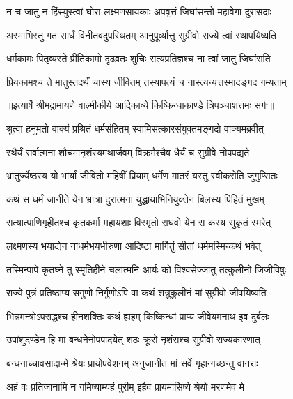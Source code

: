 \twolineshloka
{न च जातु न हिंस्युस्त्वां घोरा लक्ष्मणसायकाः}
{अपवृत्तं जिघांसन्तो महावेगा दुरासदाः} %

\twolineshloka
{अस्माभिस्तु गतं सार्धं विनीतवदुपस्थितम्}
{आनुपूर्व्यात्तु सुग्रीवो राज्ये त्वां स्थापयिष्यति} %

\twolineshloka
{धर्मकामः पितृव्यस्ते प्रीतिकामो दृढव्रतः}
{शुचिः सत्यप्रतिज्ञश्च ना त्वां जातु जिघांसति} %

\twolineshloka
{प्रियकामश्च ते मातुस्तदर्थं चास्य जीवितम्}
{तस्यापत्यं च नास्त्यन्यत्तस्मादङ्गद गम्यताम्} %


{॥इत्यार्षे श्रीमद्रामायणे वाल्मीकीये आदिकाव्ये किष्किन्धाकाण्डे त्रिपञ्चाशत्तमः सर्गः॥}


\twolineshloka
{श्रुत्वा हनुमतो वाक्यं प्रश्रितं धर्मसंहितम्}
{स्वामिसत्कारसंयुक्तमङ्गदो वाक्यमब्रवीत्} %

\twolineshloka
{स्थैर्यं सर्वात्मना शौचमानृशंस्यमथार्जवम्}
{विक्रमैश्चैव धैर्यं च सुग्रीवे नोपपद्यते} %

\twolineshloka
{भ्रातुर्ज्येष्ठस्य यो भार्यां जीवितो महिषीं प्रियाम्}
{धर्मेण मातरं यस्तु स्वीकरोति जुगुप्सितः} %

\twolineshloka
{कथं स धर्मं जानीते येन भ्रात्रा दुरात्मना}
{युद्धायाभिनियुक्तेन बिलस्य पिहितं मुखम्} %

\twolineshloka
{सत्यात्पाणिगृहीतश्च कृतकर्मा महायशाः}
{विस्मृतो राघवो येन स कस्य सुकृतं स्मरेत्} %

\twolineshloka
{लक्ष्मणस्य भयाद्येन नाधर्मभयभीरुणा}
{आदिष्टा मार्गितुं सीतां धर्ममस्मिन्कथं भवेत्} %

\twolineshloka
{तस्मिन्पापे कृतघ्ने तु स्मृतिहीने चलात्मनि}
{आर्यः को विश्वसेज्जातु तत्कुलीनो जिजीविषुः} %

\twolineshloka
{राज्ये पुत्रं प्रतिष्ठाप्य सगुणो निर्गुणोऽपि वा}
{कथं शत्रुकुलीनं मां सुग्रीवो जीवयिष्यति} %

\twolineshloka
{भिन्नमन्त्रोऽपराद्धश्च हीनशक्तिः कथं ह्यहम्}
{किष्किन्धां प्राप्य जीवेयमनाथ इव दुर्बलः} %

\twolineshloka
{उपांशुदण्डेन हि मां बन्धनेनोपपादयेत्}
{शठः क्रूरो नृशंसश्च सुग्रीवो राज्यकारणात्} %

\twolineshloka
{बन्धनाच्चावसादान्मे श्रेयः प्रायोपवेशनम्}
{अनुजानीत मां सर्वे गृहान्गच्छन्तु वानराः} %

\twolineshloka
{अहं वः प्रतिजानामि न गमिष्याम्यहं पुरीम्}
{इहैव प्रायमासिष्ये श्रेयो मरणमेव मे} %

